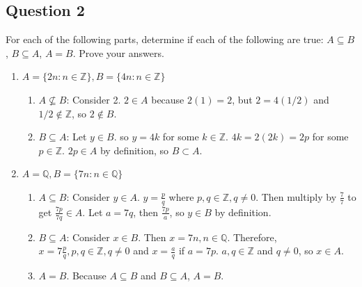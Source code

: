 \documentclass{article}
\begin{document}
\subsection*{Question 2}
For each of the following parts, determine if each of the following are true: $A \subseteq B$, $B \subseteq A$, $A = B$. Prove your answers. 
\begin{enumerate}
    \item $A = \{2n : n \in \mathbb{Z} \}, B = \{4n : n \in \mathbb{Z} \}$
    \begin{mdframed}
        \begin{enumerate}
            \item $A \not\subseteq B$: Consider 2. $2 \in A$ because $2(1) = 2$, but $2 = 4(1/2)$ and $1/2 \notin \mathbb{Z}$, so $2 \notin B$.
            \item $B \subseteq A$: Let $y \in B$. so $y = 4k$ for some $k \in \mathbb{Z}$. $4k = 2(2k) = 2p$ for some $p \in \mathbb{Z}$. $2p \in A$ by definition, so $B \subset A$.
        \end{enumerate}
    \end{mdframed}
    \item $A = \mathbb{Q}, B = \{7n : n \in \mathbb{Q}\}$
    \begin{mdframed}
        \begin{enumerate}
            \item $A \subseteq B$: Consider $y \in A$. $y = \frac{p}{q}$ where $p, q \in \mathbb{Z}, q \neq 0$. Then multiply by $\frac{7}{7}$ to get $\frac{7p}{7q} \in A$. Let $a = 7q$, then $\frac{7p}{a}$, so $y \in B$ by definition.
            \item $B \subseteq A$: Consider $x \in B$. Then $x = 7n, n \in \mathbb{Q}$. Therefore, $x = 7\frac{p}{q}, p, q\in \mathbb{Z}, q \neq 0$ and $x = \frac{a}{q}$ if $a = 7p$. $a, q \in \mathbb{Z}$ and $q \neq 0$, so $x \in A$.
            \item $A = B$. Because $A \subseteq B$ and $B \subseteq A$, $A = B$.
        \end{enumerate}
    \end{mdframed}


\end{enumerate}
\end{document}

